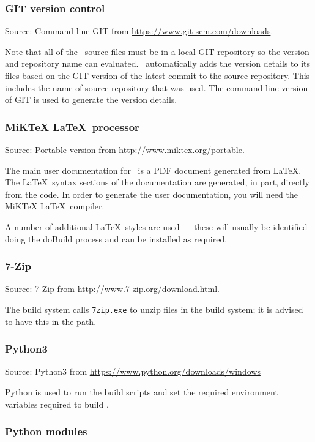 \subsubsection*{GIT version control}

Source: Command line GIT from \url{https://www.git-scm.com/downloads}.

Note that all of the \CNAME\ source files must be in a local GIT repository so the version and repository name can evaluated. \CNAME\ automatically adds the version details to its files based on the GIT version of the latest commit to the source repository. This includes the name of source repository that was used. The command line version of GIT is used  to generate the version details.

\subsubsection*{MiKTeX \LaTeX\ processor}

Source: Portable version from \url{http://www.miktex.org/portable}.

The main user documentation for \CNAME\ is a PDF document generated from \LaTeX. The \LaTeX\ syntax sections of the documentation are generated, in part, directly from the code. In order to generate the user documentation, you will need the MiKTeX \LaTeX\ compiler.

A number of additional \LaTeX\ styles are used --- these will usually be identified doing the doBuild process and can be installed as required. 

\subsubsection*{7-Zip}

Source: 7-Zip from \url{http://www.7-zip.org/download.html}.

The build system calls \texttt{7zip.exe} to unzip files in the build system; it is advised to have this in the path.

\subsubsection*{Python3}

Source: Python3 from \url{https://www.python.org/downloads/windows}

Python is used to run the build scripts and set the required environment variables required to build \CNAME. 

\subsubsection*{Python modules}

